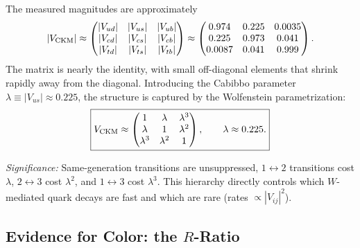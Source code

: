 The measured magnitudes are approximately
\begin{equation}
  |V_{\rm CKM}| \approx
  \begin{pmatrix}
    |V_{ud}| & |V_{us}| & |V_{ub}| \\
    |V_{cd}| & |V_{cs}| & |V_{cb}| \\
    |V_{td}| & |V_{ts}| & |V_{tb}|
  \end{pmatrix}
  \approx
  \begin{pmatrix}
    0.974 & 0.225 & 0.0035 \\
    0.225 & 0.973 & 0.041 \\
    0.0087 & 0.041 & 0.999
  \end{pmatrix}.
  \label{eq:lec21:ckm-numbers}
\end{equation}
The matrix is nearly the identity, with small off-diagonal elements that
shrink rapidly away from the diagonal. Introducing the Cabibbo parameter
$\lambda\equiv|V_{us}|\approx 0.225$, the structure is captured by the
Wolfenstein parametrization:
\begin{equation}
  \boxed{
    V_{\rm CKM} \approx
    \begin{pmatrix}
      1 & \lambda & \lambda^3 \\
      \lambda & 1 & \lambda^2 \\
      \lambda^3 & \lambda^2 & 1
    \end{pmatrix},
    \qquad \lambda\approx 0.225 .
  }
  \label{eq:lec21:wolfenstein}
\end{equation}

\textit{Significance:} Same-generation transitions are unsuppressed,
$1\leftrightarrow2$ transitions cost $\lambda$, $2\leftrightarrow3$ cost
$\lambda^2$, and $1\leftrightarrow3$ cost $\lambda^3$. This hierarchy
directly controls which $W$-mediated quark decays are fast and which are
rare (rates $\propto|V_{ij}|^2$).


\subsection{Evidence for Color: the \texorpdfstring{$R$}{R}-Ratio}\label{subsec:lec21:color}

